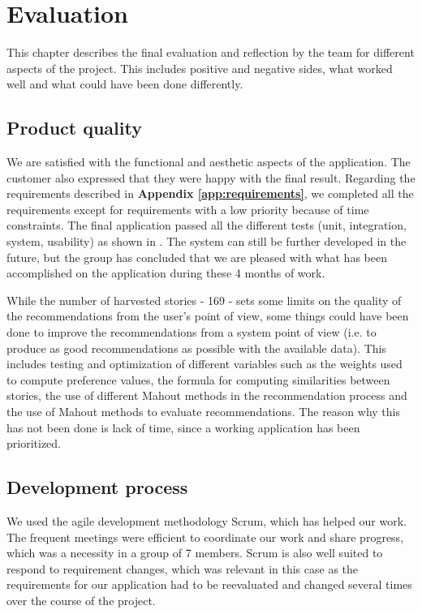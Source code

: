 
\chapter{Evaluation}

This chapter describes the final evaluation and reflection by the team for different aspects of the project. This includes positive and negative sides, what worked well and what could have been done differently.

\section{Product quality}

We are satisfied with the functional and aesthetic aspects of the application. The customer also expressed that they were happy with the final result. Regarding the requirements described in \textbf{Appendix \ref{app:requirements}}, we completed all the requirements except for requirements with a low priority because of time constraints.
The final application passed all the different tests (unit, integration, system, usability) as shown in \textbf{}. The system can still be further developed in the future, but the group has concluded that we are pleased with what has been accomplished on the application during these 4 months of work.\newline

While the number of harvested stories - 169 - sets some limits on the quality of the recommendations from the user's point of view, some things could have been done to improve the recommendations from a system point of view (i.e. to produce as good recommendations as possible with the available data). This includes testing and optimization of different variables such as the weights used to compute preference values, the formula for computing similarities between stories, the use of different Mahout methods in the recommendation process and the use of Mahout methods to evaluate recommendations. The reason why this has not been done is lack of time, since a working application has been prioritized.

\section{Development process}

We used the agile development methodology Scrum, which has helped our work. The frequent meetings were efficient to coordinate our work and share progress, which was a necessity in a group of 7 members. Scrum is also well suited to respond to requirement changes, which was relevant in this case as the requirements for our application had to be reevaluated and changed several times over the course of the project.

